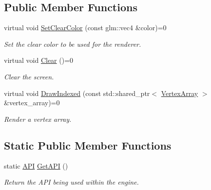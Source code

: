 \subsection*{Public Member Functions}
\begin{DoxyCompactItemize}
\item 
\mbox{\label{classengine_1_1renderer_1_1RendererAPI_aafd69df2fdce94fbde4142d392a04b37}} 
virtual void \hyperlink{classengine_1_1renderer_1_1RendererAPI_aafd69df2fdce94fbde4142d392a04b37}{Set\+Clear\+Color} (const glm\+::vec4 \&color)=0
\begin{DoxyCompactList}\small\item\em Set the clear color to be used for the renderer. \end{DoxyCompactList}\item 
\mbox{\label{classengine_1_1renderer_1_1RendererAPI_ac4d98acc58992af16ffff59e659e3c60}} 
virtual void \hyperlink{classengine_1_1renderer_1_1RendererAPI_ac4d98acc58992af16ffff59e659e3c60}{Clear} ()=0
\begin{DoxyCompactList}\small\item\em Clear the screen. \end{DoxyCompactList}\item 
\mbox{\label{classengine_1_1renderer_1_1RendererAPI_ab818163e2f93e9d0a508ac29a65a30af}} 
virtual void \hyperlink{classengine_1_1renderer_1_1RendererAPI_ab818163e2f93e9d0a508ac29a65a30af}{Draw\+Indexed} (const std\+::shared\+\_\+ptr$<$ \hyperlink{classengine_1_1renderer_1_1VertexArray}{Vertex\+Array} $>$ \&vertex\+\_\+array)=0
\begin{DoxyCompactList}\small\item\em Render a vertex array. \end{DoxyCompactList}\end{DoxyCompactItemize}
\subsection*{Static Public Member Functions}
\begin{DoxyCompactItemize}
\item 
\mbox{\label{classengine_1_1renderer_1_1RendererAPI_a5e72b9d9f135fe4689f712cf7f5b9a3d}} 
static \hyperlink{classengine_1_1renderer_1_1RendererAPI_a624c2793dc8b315466c36332bbc82ef0}{A\+PI} \hyperlink{classengine_1_1renderer_1_1RendererAPI_a5e72b9d9f135fe4689f712cf7f5b9a3d}{Get\+A\+PI} ()
\begin{DoxyCompactList}\small\item\em Return the A\+PI being used within the engine. \end{DoxyCompactList}\end{DoxyCompactItemize}


